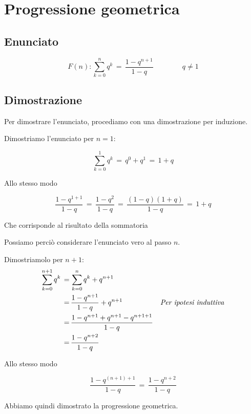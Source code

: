 \documentclass[../../analisi1]{subfiles}
\begin{document}
    \chapter{Progressione geometrica}

        \section*{Enunciato}       

            \[F(n): \sum_{k=0}^{n}q^k \, = \, \frac{1-q^{n+1}}{1-q} \qquad \qquad q \neq 1 \]

        \section*{Dimostrazione}

            Per dimostrare l'enunciato, procediamo con una dimostrazione per induzione.

            \medskip

            Dimostriamo l'enunciato per \(n = 1\):
            
            \[\sum_{k=0}^{1}q^k \, = \, q^0 + q^1 \, = \, 1 + q\]
            
            Allo stesso modo

            \[\frac{1-q^{1+1}}{1-q} \, = \, \frac{1-q^2}{1-q} \, = \, \frac{(1-q)(1+q)}{1-q} \, = \, 1+q\]

            Che corrisponde al risultato della sommatoria

            Possiamo perciò considerare l'enunciato vero al passo \(n\).

            \medskip

            Dimostriamolo per \(n + 1\):
            \begin{align*}
                \sum_{k=0}^{n+1}q^k \,=& \, \sum_{k=0}^{n}q^k + q^{n+1} \\
                                =& \, \frac{1-q^{n+1}}{1-q} + q^{n+1} & \text{\emph{Per ipotesi induttiva}} \\
                                =& \, \frac{1-q^{n+1} + q^{n+1} - q^{n+1+1}}{1-q} \\
                                =& \, \frac{1-q^{n+2}}{1-q} \\
            \end{align*}

            Allo stesso modo

            \[\frac{1-q^{(n+1)+1}}{1-q} \, = \, \frac{1-q^{n+2}}{1-q} \]

            Abbiamo quindi dimostrato la progressione geometrica.
    
\end{document}
